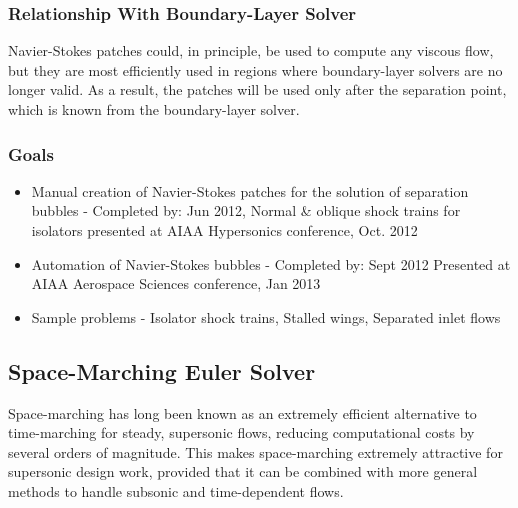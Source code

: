 \documentclass[12pt,letterpaper]{article}
\begin{document}
\subsubsection{Relationship With Boundary-Layer Solver}
Navier-Stokes patches could, in principle, be used to compute any
viscous flow, but they are most efficiently used in regions where
boundary-layer solvers are no longer valid. As a result, the patches
will be used only after the separation point, which
is known from the boundary-layer solver.


\subsubsection{Goals}
\begin{itemize}
\item
Manual creation of Navier-Stokes patches for the solution of
separation bubbles - 
Completed by: Jun 2012, Normal \& oblique shock trains for isolators 
presented at AIAA Hypersonics conference, Oct. 2012
\item
Automation of Navier-Stokes bubbles - Completed by: Sept 2012
Presented at AIAA Aerospace Sciences conference, Jan 2013
\item Sample problems - Isolator shock trains, Stalled wings,
  Separated inlet flows
\end{itemize}
\subsection{Space-Marching Euler Solver}
Space-marching has long been known as an extremely efficient
alternative to time-marching for steady, supersonic flows, reducing
computational costs by several orders of magnitude. This makes
space-marching extremely attractive for supersonic design work,
provided that it can be combined with more general methods to handle
subsonic and time-dependent flows.
\end{document}
